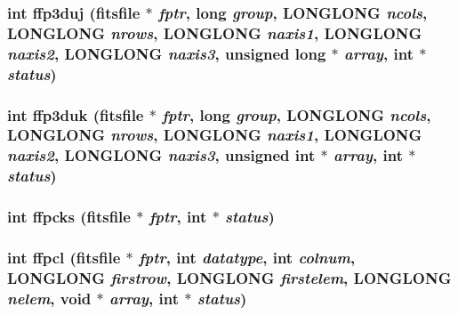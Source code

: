 \subsubsection{\setlength{\rightskip}{0pt plus 5cm}int ffp3duj (\bf{fitsfile} $\ast$ {\em fptr}, long {\em group}, \bf{LONGLONG} {\em ncols}, \bf{LONGLONG} {\em nrows}, \bf{LONGLONG} {\em naxis1}, \bf{LONGLONG} {\em naxis2}, \bf{LONGLONG} {\em naxis3}, unsigned long $\ast$ {\em array}, int $\ast$ {\em status})}\label{test_2shm__client_2fitsio_8h_1e610ca12d1921d2b12d1f51184ec1fb}


\subsubsection{\setlength{\rightskip}{0pt plus 5cm}int ffp3duk (\bf{fitsfile} $\ast$ {\em fptr}, long {\em group}, \bf{LONGLONG} {\em ncols}, \bf{LONGLONG} {\em nrows}, \bf{LONGLONG} {\em naxis1}, \bf{LONGLONG} {\em naxis2}, \bf{LONGLONG} {\em naxis3}, unsigned int $\ast$ {\em array}, int $\ast$ {\em status})}\label{test_2shm__client_2fitsio_8h_245d5b7ef5c4c394dbc0c7f3f55a5857}


\subsubsection{\setlength{\rightskip}{0pt plus 5cm}int ffpcks (\bf{fitsfile} $\ast$ {\em fptr}, int $\ast$ {\em status})}\label{test_2shm__client_2fitsio_8h_1063ed09b8a73de4a574e6c4a49c1d72}


\subsubsection{\setlength{\rightskip}{0pt plus 5cm}int ffpcl (\bf{fitsfile} $\ast$ {\em fptr}, int {\em datatype}, int {\em colnum}, \bf{LONGLONG} {\em firstrow}, \bf{LONGLONG} {\em firstelem}, \bf{LONGLONG} {\em nelem}, void $\ast$ {\em array}, int $\ast$ {\em status})}\label{test_2shm__client_2fitsio_8h_28b5f096ba5dc640cd642afdf31c7e01}


